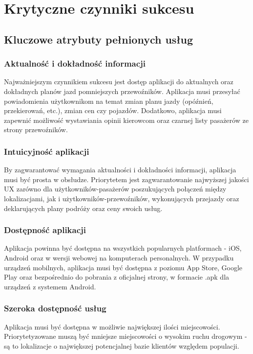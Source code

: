 \chapter{Krytyczne czynniki sukcesu}
\label{chap:trzeci}

\section{Kluczowe atrybuty pełnionych usług}
\subsection{Aktualność i dokładność informacji}
Najważniejszym czynnikiem sukcesu jest dostęp aplikacji do aktualnych oraz dokładnych planów jazd pomniejszych przewoźników. Aplikacja musi przesyłać powiadomienia użytkownikom na temat zmian planu jazdy (opóźnień, przekierowań, etc.), zmian cen czy pojazdów. Dodatkowo, aplikacja musi zapewnić możliwość wystawiania opinii kierowcom oraz czarnej listy pasażerów ze strony przewoźników.

\subsection{Intuicyjność aplikacji}
By zagwarantować wymagania aktualności i dokładności informacji, aplikacja musi być prosta w obsłudze. Priorytetem jest zagwarantowanie najwyższej jakości UX zarówno dla użytkowników-pasażerów poszukujących połączeń między lokalizacjami, jak i użytkowników-przewoźników, wykonujących przejazdy oraz deklarujących plany podróży oraz ceny swoich usług.

\subsection{Dostępność aplikacji}
Aplikacja powinna być dostępna na wszystkich popularnych platformach - iOS, Android oraz w wersji webowej na komputerach personalnych. W przypadku urządzeń mobilnych, aplikacja musi być dostępna z poziomu App Store, Google Play oraz bezpośrednio do pobrania z oficjalnej strony, w formacie .apk dla urządzeń z systemem Android. 

\subsection{Szeroka dostępność usług}
Aplikacja musi być dostępna w możliwie największej ilości miejscowości. Priorytetyzowane muszą być mniejsze miejscowości o wysokim ruchu drogowym - są to lokalizacje o największej potencjalnej bazie klientów względem populacji.

